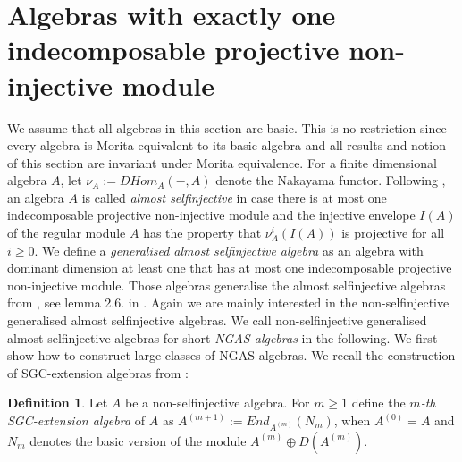 \documentclass[a4paper]{amsart}
\theoremstyle{definition}
\newtheorem{definition}[theorem]{Definition}
\theoremstyle{remark}
\numberwithin{equation}{theorem}
\begin{document}
\section{Algebras with exactly one indecomposable projective non-injective module}
We assume that all algebras in this section are basic. This is no restriction since every algebra is Morita equivalent to its basic algebra and all results and notion of this section are invariant under Morita equivalence.
For a finite dimensional algebra $A$, let $\nu_A:=DHom_A(-,A)$ denote the Nakayama functor. Following \cite{FHK}, an algebra $A$ is called \emph{almost selfinjective} in case there is at most one indecomposable projective non-injective module and the injective envelope $I(A)$ of the regular module $A$ has the property that $\nu_A^i(I(A))$ is projective for all $i \geq 0$.
We define a \emph{generalised almost selfinjective algebra} as an algebra with dominant dimension at least one that has at most one indecomposable projective non-injective module. Those algebras generalise the almost selfinjective algebras from \cite{FHK}, see lemma 2.6. in \cite{FHK}. 
Again we are mainly interested in the non-selfinjective generalised almost selfinjective algebras. We call non-selfinjective generalised almost selfinjective algebras for short \emph{NGAS algebras} in the following.
We first show how to construct large classes of NGAS algebras.
We recall the construction of SGC-extension algebras from \cite{CIM}:
\begin{definition}
Let $A$ be a non-selfinjective algebra. For $m \geq 1$ define the \emph{$m$-th SGC-extension algebra} of $A$ as $A^{(m+1)}:=End_{A^{(m)}}(N_m)$, when $A^{(0)}=A$ and $N_m$ denotes the basic version of the module $A^{(m)} \oplus D(A^{(m)})$.
\end{definition}
\end{document}
